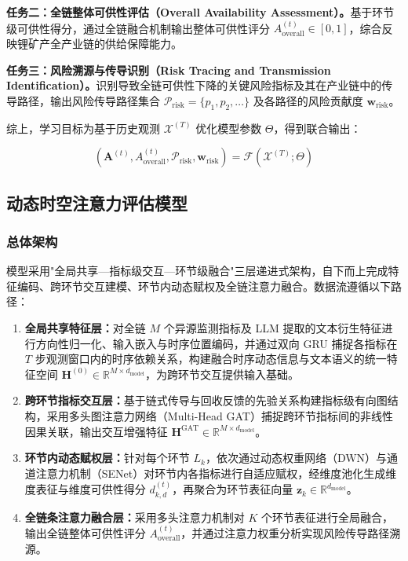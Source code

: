 \textbf{任务二：全链整体可供性评估（Overall Availability Assessment）。}基于环节级可供性得分，通过全链融合机制输出整体可供性评分 $A_{\text{overall}}^{(t)}\in[0,1]$，综合反映锂矿产全产业链的供给保障能力。

\textbf{任务三：风险溯源与传导识别（Risk Tracing and Transmission Identification）。}识别导致全链可供性下降的关键风险指标及其在产业链中的传导路径，输出风险传导路径集合 $\mathcal{P}_{\text{risk}}=\{p_1,p_2,\ldots\}$ 及各路径的风险贡献度 $\mathbf{w}_{\text{risk}}$。

综上，学习目标为基于历史观测 $\mathcal{X}^{(T)}$ 优化模型参数 $\Theta$，得到联合输出：

\begin{equation}
(\mathbf{A}^{(t)}, A_{\text{overall}}^{(t)}, \mathcal{P}_{\text{risk}}, \mathbf{w}_{\text{risk}}) = \mathcal{F}(\mathcal{X}^{(T)}; \Theta)
\end{equation}

\subsection{动态时空注意力评估模型}

\subsubsection{总体架构}

模型采用"全局共享—指标级交互—环节级融合"三层递进式架构，自下而上完成特征编码、跨环节交互建模、环节内动态赋权及全链注意力融合。数据流遵循以下路径：

\begin{enumerate}
\item \textbf{全局共享特征层：}对全链 $M$ 个异源监测指标及 LLM 提取的文本衍生特征进行方向性归一化、输入嵌入与时序位置编码，并通过双向 GRU 捕捉各指标在 $T$ 步观测窗口内的时序依赖关系，构建融合时序动态信息与文本语义的统一特征空间 $\mathbf{H}^{(0)}\in\mathbb{R}^{M\times d_{\text{model}}}$，为跨环节交互提供输入基础。
\item \textbf{跨环节指标交互层：}基于链式传导与回收反馈的先验关系构建指标级有向图结构，采用多头图注意力网络（Multi-Head GAT）捕捉跨环节指标间的非线性因果关联，输出交互增强特征 $\mathbf{H}^{\text{GAT}}\in\mathbb{R}^{M\times d_{\text{model}}}$。
\item \textbf{环节内动态赋权层：}针对每个环节 $L_k$，依次通过动态权重网络（DWN）与通道注意力机制（SENet）对环节内各指标进行自适应赋权，经维度池化生成维度表征与维度可供性得分 $d_{k,d}^{(t)}$，再聚合为环节表征向量 $\mathbf{z}_k\in\mathbb{R}^{d_{\text{model}}}$。
\item \textbf{全链条注意力融合层：}采用多头注意力机制对 $K$ 个环节表征进行全局融合，输出全链整体可供性评分 $A_{\text{overall}}^{(t)}$，并通过注意力权重分析实现风险传导路径溯源。
\end{enumerate}

